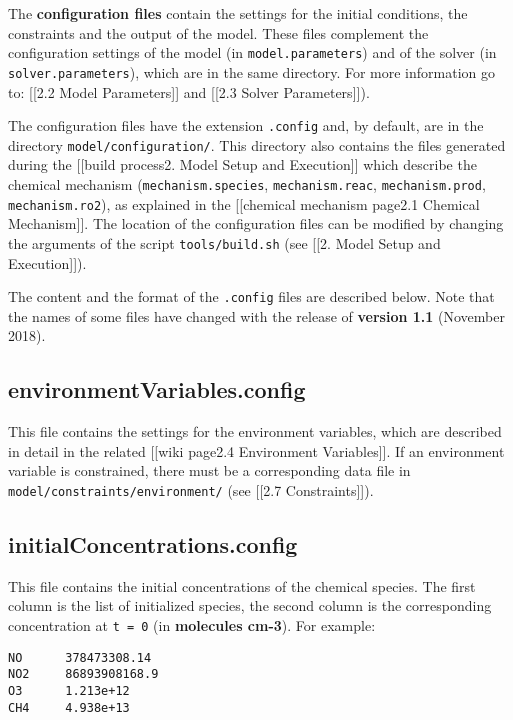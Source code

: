 The \textbf{configuration files} contain the settings for the initial
conditions, the constraints and the output of the model. These files
complement the configuration settings of the model (in
\texttt{model.parameters}) and of the solver (in
\texttt{solver.parameters}), which are in the same directory. For more
information go to: {[}{[}2.2 Model Parameters{]}{]} and {[}{[}2.3
Solver Parameters{]}{]}).

The configuration files have the extension \texttt{.config} and, by
default, are in the directory \texttt{model/configuration/}. This
directory also contains the files generated during the {[}{[}build
process\textbar{}2. Model Setup and Execution{]}{]} which describe the
chemical mechanism (\texttt{mechanism.species},
\texttt{mechanism.reac}, \texttt{mechanism.prod},
\texttt{mechanism.ro2}), as explained in the {[}{[}chemical mechanism
page\textbar{}2.1 Chemical Mechanism{]}{]}. The location of the
configuration files can be modified by changing the arguments of the
script \texttt{tools/build.sh} (see {[}{[}2. Model Setup and
Execution{]}{]}).

The content and the format of the \texttt{.config} files are described
below. Note that the names of some files have changed with the release
of \textbf{version 1.1} (November 2018).

\subsection{environmentVariables.config} \label{subsec:environmentvariables}

This file contains the settings for the environment variables, which
are described in detail in the related {[}{[}wiki page\textbar{}2.4
Environment Variables{]}{]}. If an environment variable is
constrained, there must be a corresponding data file in
\texttt{model/constraints/environment/} (see {[}{[}2.7
Constraints{]}{]}).

\subsection{initialConcentrations.config} \label{subsec:initialconcentrations}

This file contains the initial concentrations of the chemical species.
The first column is the list of initialized species, the second column
is the corresponding concentration at \texttt{t\ =\ 0} (in
\textbf{molecules cm-3}). For example:

\begin{verbatim}
NO      378473308.14
NO2     86893908168.9
O3      1.213e+12
CH4     4.938e+13
\end{verbatim}

